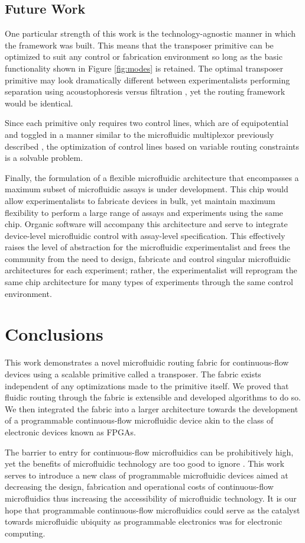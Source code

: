 


\subsection{Future Work}
One particular strength of this work is the technology-agnostic manner in which the framework was built. This means that the transposer primitive can be optimized to suit any control or fabrication environment so long as the basic functionality shown in Figure \ref{fig:modes} is retained. The optimal transposer primitive may look dramatically different between experimentalists performing separation using acoustophoresis \cite{petersson2007free} versus filtration \cite{pamme2007continuous}, yet the routing framework would be identical.

Since each primitive only requires two control lines, which are of equipotential and toggled in a manner similar to the microfluidic multiplexor previously described \cite{thorsen2002}, the optimization of control lines based on variable routing constraints is a solvable problem.

Finally, the formulation of a flexible microfluidic architecture that encompasses a maximum subset of microfluidic assays is under development. This chip would allow experimentalists to fabricate devices in bulk, yet maintain maximum flexibility to perform a large range of assays and experiments using the same chip. Organic software will accompany this architecture and serve to integrate device-level microfluidic control with assay-level specification. This effectively raises the level of abstraction for the microfluidic experimentalist and frees the community from the need to design, fabricate and control singular microfluidic architectures for each experiment; rather, the experimentalist will reprogram the same chip architecture for many types of experiments through the same control environment.

\section{Conclusions}
This work demonstrates a novel microfluidic routing fabric for continuous-flow devices using a scalable primitive called a transposer. The fabric exists independent of any optimizations made to the primitive itself. We proved that fluidic routing through the fabric is extensible and developed algorithms to do so. We then integrated the fabric into a larger architecture towards the development of a programmable continuous-flow microfluidic device akin to the class of electronic devices known as FPGAs. 

The barrier to entry for continuous-flow microfluidics can be prohibitively high, yet the benefits of microfluidic technology are too good to ignore \cite{whitesides2006}. This work serves to introduce a new class of programmable microfluidic devices aimed at decreasing the design, fabrication and operational costs of continuous-flow microfluidics thus increasing the accessibility of microfluidic technology. It is our hope that programmable continuous-flow microfluidics could serve as the catalyst towards microfluidic ubiquity as programmable electronics was for electronic computing.
